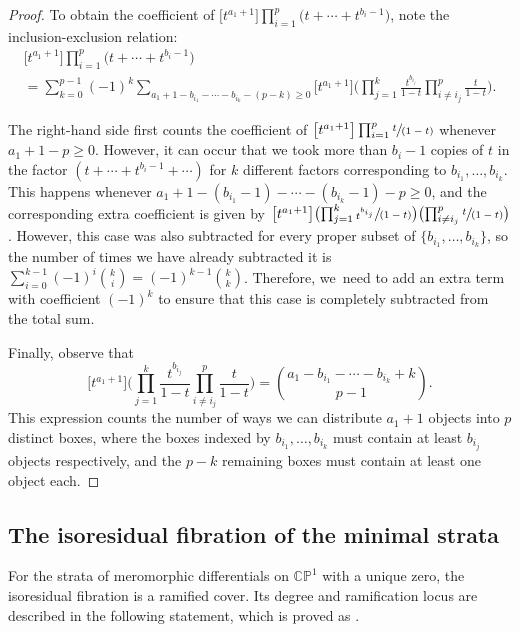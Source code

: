 \documentclass[JEP,XML,SOM,Unicode,NoFloatCountersInSection,published]{cedram}
\newcommand{\spfrac}[2]{\sfrac{#1}{(#2)}}
\theoremstyle{definition}
\begin{document}
\begin{proof}
To obtain the coefficient of $\big[t^{a_1+1}\big]\prod_{i=1}^p \big(t + \cdots + t^{b_i-1}\big)$, note the inclusion-exclusion relation:
\begin{multline*}
\big[t^{a_1+1}\big]\prod_{i=1}^p \big(t + \cdots + t^{b_i-1}\big)\\[-10pt]
= \sum_{k=0}^{p-1} (-1)^k \sum_{a_{1}+1-b_{i_1}-\cdots-b_{i_k}-(p-k)\geq 0} \big[t^{a_1+1}\big]\biggl(\prod_{j=1}^k \frac{t^{b_{i_j}}}{1-t}\prod_{i\not= i_j}^p\frac{t}{1-t}\biggr).
\end{multline*}

The right-hand side first counts the coefficient of $\big[t^{a_1+1}\big]\prod_{i=1}^p \spfrac{t}{1-t}$ whenever $a_1+1-p\geq 0$. However, it can occur that we took more than $b_i-1$ copies of $t$ in the factor $(t+\cdots+t^{b_{i}-1}+\cdots)$ for $k$ different factors corresponding to $b_{i_1},\ldots, b_{i_k}$. This happens whenever $a_1+1-(b_{i_1}-1)-\cdots-(b_{i_k}-1)-p\geq 0$, and the corresponding extra coefficient is given by $\big[t^{a_1+1}\big]\bigl(\prod_{j=1}^k \spfrac{t^{b_{i_j}}}{1-t}\bigr)\bigl(\prod_{i\not= i_j}^p\spfrac{t}{1-t}\bigr)$. However, this case was also subtracted for every proper subset of $\{b_{i_1},\ldots, b_{i_k}\}$, so the number of times we have already subtracted it is $\sum_{i=0}^{k-1}(-1)^i\binom{k}{i}=(-1)^{k-1}\binom{k}{k}$. Therefore, we~need to add an extra term with coefficient $(-1)^k$ to ensure that this case is completely subtracted from the total sum.

Finally, observe that
\begin{equation*}\label{eq:Counting}
\big[t^{a_1+1}\big]\biggl(\prod_{j=1}^k \frac{t^{b_{i_j}}}{1-t}\prod_{i\not=i_j}^p\frac{t}{1-t}\biggr) = \binom{a_1-b_{i_1}-\cdots - b_{i_k}+k}{p-1}.
\end{equation*}
This expression counts the number of ways we can distribute $a_1+1$ objects into $p$ distinct boxes, where the boxes indexed by $b_{i_1},\ldots, b_{i_{k}}$ must contain at least $b_{i_j}$ objects respectively, and the $p-k$ remaining boxes must contain at least one object each.
\end{proof}

\subsection{The isoresidual fibration of the minimal strata}\label{sub:Minimal}

For the strata of meromorphic differentials on $\mathbb{CP}^{1}$ with a unique zero, the isoresidual fibration is a ramified cover. Its degree and ramification locus are described in the following statement, which is proved as \cite[Th.\,1.2]{GeTaIso}.
\end{document}

